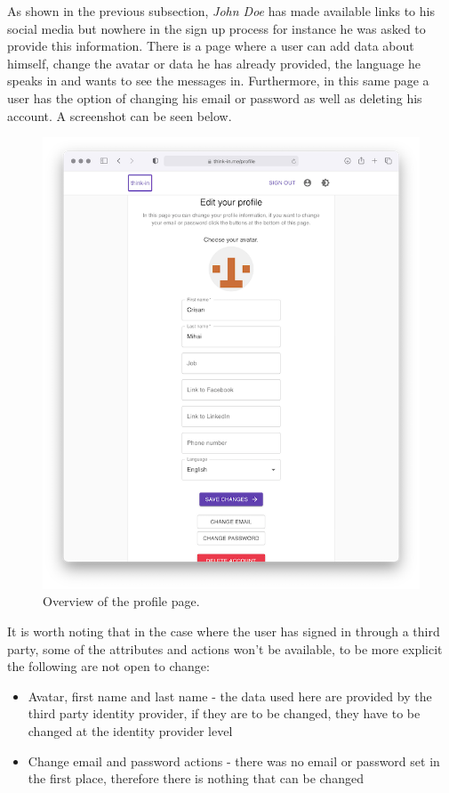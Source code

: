 As shown in the previous subsection, \textit{John Doe} has made available links to his social media but nowhere in the sign up process for instance he was asked to provide this information. There is a page where a user can add data about himself, change the avatar or data he has already provided, the language he speaks in and wants to see the messages in. Furthermore, in this same page a user has the option of changing his email or password as well as deleting his account. A screenshot can be seen below.

\begin{figure}[H]
	\centering
	\includegraphics[width=\textwidth,keepaspectratio]{images/business_logic/profile_page.png}
	\caption{Overview of the profile page.}
	\label{figure:website-profile-page}
\end{figure}

It is worth noting that in the case where the user has signed in through a third party, some of the attributes and actions won't be available, to be more explicit the following are not open to change:

\begin{itemize}
	\item Avatar, first name and last name - the data used here are provided by the third party identity provider, if they are to be changed, they have to be changed at the identity provider level
	\item Change email and password actions - there was no email or password set in the first place, therefore there is nothing that can be changed
\end{itemize}

